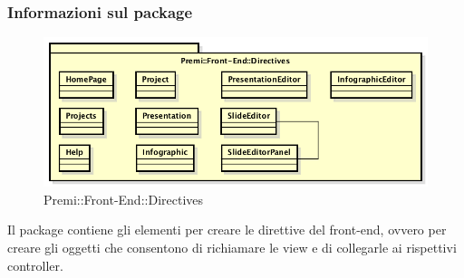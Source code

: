 \subsubsection*{Informazioni sul package}
\begin{figure}[h]
	\centering
	\includegraphics[width=0.9\linewidth]{img/front-end_directives}
	\caption[Premi::Front-End::Directives]{Premi::Front-End::Directives}
\end{figure}
Il package contiene gli elementi per creare le direttive del \gls{front-end}, ovvero per creare gli oggetti che consentono di richiamare le view e di collegarle ai rispettivi controller.

